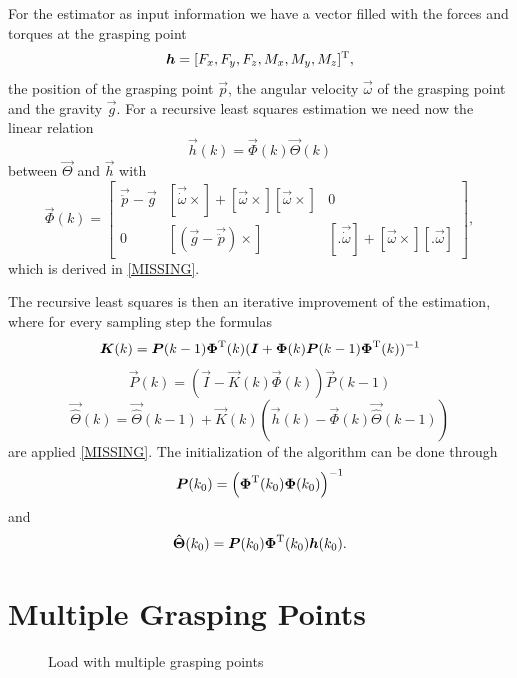 For the estimator as input information we have a vector filled with the forces and torques at the grasping point
\begin{equation}
	\boldsymbol{h} = [F_x, F_y, F_z, M_x, M_y, M_z]^{\mathrm{T}},
\end{equation}
the position of the grasping point $\vec p$, the angular velocity $\vec \omega$ of the grasping point and the gravity $\vec g$. For a recursive least squares estimation we need now the linear relation
\begin{equation}
	\vec{h}(k) = \vec{\Phi}(k) \vec{\Theta}(k)
\end{equation}
between $\vec{\Theta}$ and $\vec{h}$ with
\begin{equation}
	\vec{\Phi}(k) = 
	\begin{bmatrix}
		\vec{\ddot p} - \vec{g}	& [\vec{\dot \omega} \times] + [\vec{\omega}\times] [\vec{\omega} \times]	& 0 \\
		0			& [(\vec{g} - \vec{\ddot p}) \times]									& [.  \vec{\dot \omega}] + [\vec{\omega} \times] [. \vec{\omega}]
	\end{bmatrix},
\end{equation}
which is derived in \ref{MISSING}.

The recursive least squares is then an iterative improvement of the estimation, where for every sampling step the formulas
\begin{equation}
	\boldsymbol{K}(k) = \boldsymbol{P}(k-1) \boldsymbol{\Phi}^{\mathrm{T}}(k) (\boldsymbol{I} + \boldsymbol{\Phi}(k) \boldsymbol{P}(k - 1) \boldsymbol{\Phi}^{\mathrm{T}}(k))^{-1}
\end{equation}
\begin{equation}
	\vec{P}(k) = (\vec{I} - \vec{K}(k) \vec{\Phi}(k)) \vec{P}(k - 1)
\end{equation}
\begin{equation}
	\vec{\hat \Theta}(k)=\vec{ \hat \Theta}(k - 1) + \vec{K}(k) (\vec{h}(k) - \vec{\Phi}(k) \vec{\hat \Theta}(k - 1))
\end{equation}
are applied \ref{MISSING}. The initialization of the algorithm can be done through
\begin{equation}
	\boldsymbol{P}(k_0) = \left( \boldsymbol{\Phi}^{\mathrm{T}}(k_0) \boldsymbol{\Phi}(k_0) \right)^{-1}
\end{equation}
and
\begin{equation}
	\boldsymbol{\hat \Theta} (k_0) = \boldsymbol{P}(k_0) \boldsymbol{\Phi}^{\mathrm{T}}(k_0) \boldsymbol{h}(k_0).
\end{equation}

\section{Multiple Grasping Points}
\label{sec:multiple_grasping_points}
\begin{figure}
	\centering
	
	\caption{Load with multiple grasping points}
	\label{fig:load_multiple_grasping_points}
\end{figure}

